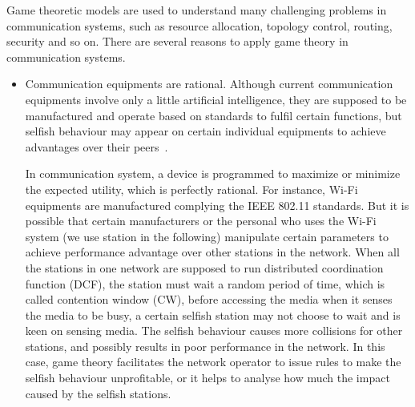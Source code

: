 Game theoretic models are used to understand many challenging problems in communication systems, such as resource allocation, topology control, routing, security and so on. 
There are several reasons to apply game theory in communication systems.
\begin{itemize}
\item Communication equipments are rational.
Although current communication equipments involve only a little artificial intelligence, they are supposed to be manufactured and operate based on standards to fulfil certain functions, but selfish behaviour may appear on certain individual equipments to achieve advantages over their peers~\cite{game_for_communication_01}.

In communication system, a device is programmed to maximize or minimize the expected utility, which is perfectly rational.
For instance, Wi-Fi equipments are manufactured complying the IEEE 802.11 standards.
But it is possible that certain manufacturers or the personal who uses the Wi-Fi system (we use station in the following) manipulate certain parameters to achieve performance advantage over other stations in the network.
When all the stations in one network are supposed to run distributed coordination function (\gls{DCF}), \ie the station must wait a random period of time, which is called contention window (\gls{CW}), before accessing the media when it senses the media to be busy, a certain selfish station may not choose to wait and is keen on sensing media.
The selfish behaviour causes more collisions for other stations, and possibly results in poor performance in the network.
In this case, game theory facilitates the network operator to issue rules to make the selfish behaviour unprofitable, or it helps to analyse how much the impact caused by the selfish stations.


\end{itemize}
